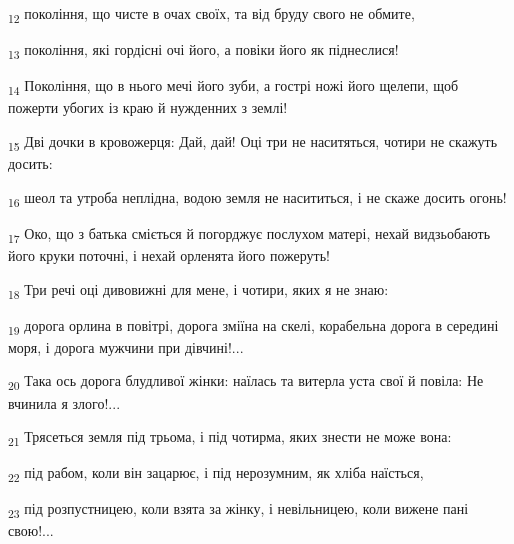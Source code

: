 \begin{tcolorbox}
\textsubscript{12} покоління, що чисте в очах своїх, та від бруду свого не обмите,
\end{tcolorbox}
\begin{tcolorbox}
\textsubscript{13} покоління, які гордісні очі його, а повіки його як піднеслися!
\end{tcolorbox}
\begin{tcolorbox}
\textsubscript{14} Покоління, що в нього мечі його зуби, а гострі ножі його щелепи, щоб пожерти убогих із краю й нужденних з землі!
\end{tcolorbox}
\begin{tcolorbox}
\textsubscript{15} Дві дочки в кровожерця: Дай, дай! Оці три не наситяться, чотири не скажуть досить:
\end{tcolorbox}
\begin{tcolorbox}
\textsubscript{16} шеол та утроба неплідна, водою земля не насититься, і не скаже досить огонь!
\end{tcolorbox}
\begin{tcolorbox}
\textsubscript{17} Око, що з батька сміється й погорджує послухом матері, нехай видзьобають його круки поточні, і нехай орленята його пожеруть!
\end{tcolorbox}
\begin{tcolorbox}
\textsubscript{18} Три речі оці дивовижні для мене, і чотири, яких я не знаю:
\end{tcolorbox}
\begin{tcolorbox}
\textsubscript{19} дорога орлина в повітрі, дорога зміїна на скелі, корабельна дорога в середині моря, і дорога мужчини при дівчині!...
\end{tcolorbox}
\begin{tcolorbox}
\textsubscript{20} Така ось дорога блудливої жінки: наїлась та витерла уста свої й повіла: Не вчинила я злого!...
\end{tcolorbox}
\begin{tcolorbox}
\textsubscript{21} Трясеться земля під трьома, і під чотирма, яких знести не може вона:
\end{tcolorbox}
\begin{tcolorbox}
\textsubscript{22} під рабом, коли він зацарює, і під нерозумним, як хліба наїсться,
\end{tcolorbox}
\begin{tcolorbox}
\textsubscript{23} під розпустницею, коли взята за жінку, і невільницею, коли вижене пані свою!...
\end{tcolorbox}
